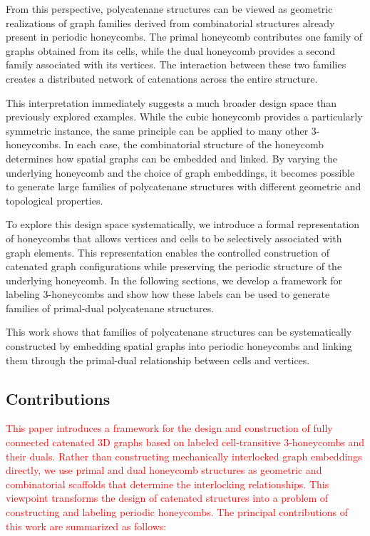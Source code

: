 \documentclass[times,twocolumn,final]{elsarticle}
\begin{document}
From this perspective, polycatenane structures can be viewed as
geometric realizations of graph families derived from
combinatorial structures already present in periodic
honeycombs. The primal honeycomb contributes one family of
graphs obtained from its cells, while the dual honeycomb
provides a second family associated with its vertices. The
interaction between these two families creates a distributed
network of catenations across the entire structure.

This interpretation immediately suggests a much broader design
space than previously explored examples. While the cubic
honeycomb provides a particularly symmetric instance, the same
principle can be applied to many other 3-honeycombs. In each
case, the combinatorial structure of the honeycomb determines
how spatial graphs can be embedded and linked. By varying the
underlying honeycomb and the choice of graph embeddings, it
becomes possible to generate large families of polycatenane
structures with different geometric and topological properties.

To explore this design space systematically, we introduce a
formal representation of honeycombs that allows vertices and
cells to be selectively associated with graph elements. This representation enables the controlled construction of catenated graph configurations while preserving the periodic structure of the
underlying honeycomb. In the following sections, we develop a
framework for labeling 3-honeycombs and show how these labels
can be used to generate families of primal-dual polycatenane
structures.

This work shows that families of polycatenane structures can be
systematically constructed by embedding spatial graphs into
periodic honeycombs and linking them through the primal-dual
relationship between cells and vertices.


\subsection{Contributions}

\textcolor{red}{This paper introduces a framework for the design and construction of fully connected catenated 3D graphs based on labeled cell-transitive 3-honeycombs and their duals. Rather than constructing mechanically interlocked graph embeddings directly, we use primal and dual honeycomb structures as geometric and combinatorial scaffolds that determine the interlocking relationships. This viewpoint transforms the design of catenated structures into a problem of constructing and labeling periodic honeycombs. The principal contributions of this work are summarized as follows:}
\end{document}

